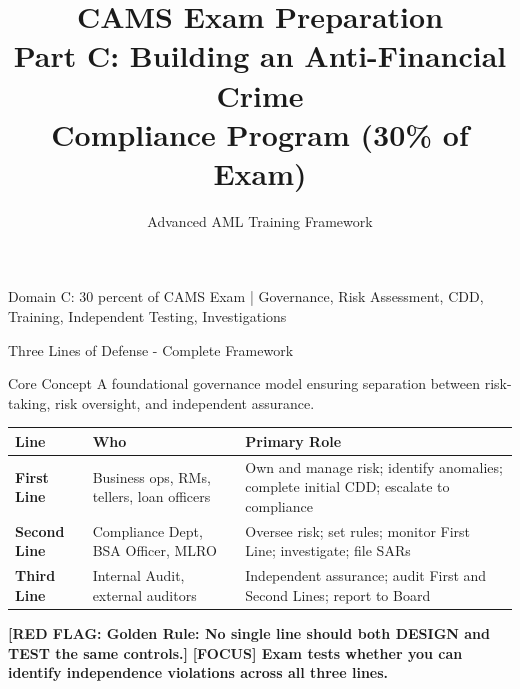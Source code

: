 \documentclass[11pt,a4paper]{beamer}
\title[CAMS Domain C]{CAMS Exam Preparation\\Part C: Building an Anti-Financial Crime\\Compliance Program (30\% of Exam)}
\author{Advanced AML Training Framework}
\date{}
\renewcommand{\tiny}{\fontsize{5pt}{6pt}\selectfont}
\newcommand{\examfocus}[1]{\textcolor{orange!80!black}{\textbf{[FOCUS] #1}}}
\newcommand{\redflag}[1]{\textcolor{red!80!black}{\textbf{[RED FLAG: #1]}}}
\begin{document}
	
	\begin{frame}
		\titlepage
		\centering
		\tiny Domain C: 30 percent of CAMS Exam | Governance, Risk Assessment, CDD, Training, Independent Testing, Investigations
	\end{frame}
	
	
	\begin{frame}{Three Lines of Defense - Complete Framework}
		\begin{block}{Core Concept}
			A foundational governance model ensuring separation between risk-taking, risk oversight, and independent assurance.
		\end{block}
		\begin{tabular}{p{}|p{}|p{0.45\textwidth}}
			\hline
			\rowcolor{lightgray}
			\textbf{Line} & \textbf{Who} & \textbf{Primary Role} \\
			\hline
			\textbf{First Line} & Business ops, RMs, tellers, loan officers & Own and manage risk; identify anomalies; complete initial CDD; escalate to compliance \\
			\hline
			\textbf{Second Line} & Compliance Dept, BSA Officer, MLRO & Oversee risk; set rules; monitor First Line; investigate; file SARs \\
			\hline
			\textbf{Third Line} & Internal Audit, external auditors & Independent assurance; audit First and Second Lines; report to Board \\
			\hline
		\end{tabular}
		\vspace{0.2cm}
		\redflag{Golden Rule: No single line should both DESIGN and TEST the same controls.}
		\examfocus{Exam tests whether you can identify independence violations across all three lines.}
	\end{frame}
	
\end{document}
